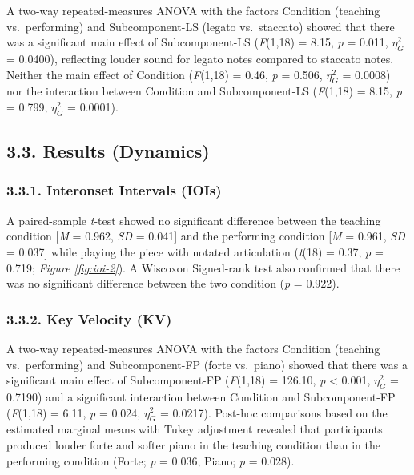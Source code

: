 \documentclass[
  english,
  man,floatsintext]{apa6}
\begin{document}
A two-way repeated-measures ANOVA with the factors Condition (teaching vs.~performing) and Subcomponent-LS (legato vs.~staccato) showed that there was a significant main effect of Subcomponent-LS (\emph{F}(1,18) = 8.15, \emph{p} = 0.011, \(\eta_G^2\) = 0.0400), reflecting louder sound for legato notes compared to staccato notes. Neither the main effect of Condition (\emph{F}(1,18) = 0.46, \emph{p} = 0.506, \(\eta_G^2\) = 0.0008) nor the interaction between Condition and Subcomponent-LS (\emph{F}(1,18) = 8.15, \emph{p} = 0.799, \(\eta_G^2\) = 0.0001).

\hypertarget{results-dynamics-1}{%
\subsection{3.3. Results (Dynamics)}\label{results-dynamics-1}}

\hypertarget{interonset-intervals-iois-3}{%
\subsubsection{3.3.1. Interonset Intervals (IOIs)}\label{interonset-intervals-iois-3}}

A paired-sample \emph{t}-test showed no significant difference between the teaching condition {[}\emph{M} = 0.962, \emph{SD} = 0.041{]} and the performing condition {[}\emph{M} = 0.961, \emph{SD} = 0.037{]} while playing the piece with notated articulation (\emph{t}(18) = 0.37, \emph{p} = 0.719; \emph{Figure \ref{fig:ioi-2}}). A Wiscoxon Signed-rank test also confirmed that there was no significant difference between the two condition (\emph{p} = 0.922).

\hypertarget{key-velocity-kv-3}{%
\subsubsection{3.3.2. Key Velocity (KV)}\label{key-velocity-kv-3}}

A two-way repeated-measures ANOVA with the factors Condition (teaching vs.~performing) and Subcomponent-FP (forte vs.~piano) showed that there was a significant main effect of Subcomponent-FP (\emph{F}(1,18) = 126.10, \emph{p} \textless{} 0.001, \(\eta_G^2\) = 0.7190) and a significant interaction between Condition and Subcomponent-FP (\emph{F}(1,18) = 6.11, \emph{p} = 0.024, \(\eta_G^2\) = 0.0217). Post-hoc comparisons based on the estimated marginal means with Tukey adjustment revealed that participants produced louder forte and softer piano in the teaching condition than in the performing condition (Forte; \emph{p} = 0.036, Piano; \emph{p} = 0.028).
\end{document}
